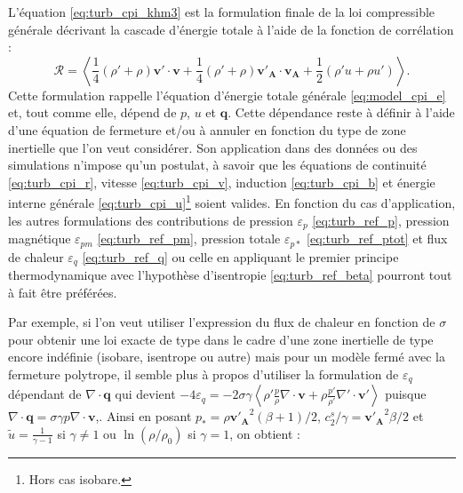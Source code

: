 L'équation \eqref{eq:turb_cpi_khm3} est la formulation finale de la loi  compressible générale décrivant la cascade d'énergie totale à l'aide de la fonction de corrélation :  
\begin{equation*}
    \mathcal{R} = \left<\frac{1}{4} \left(\rho'+\rho\right) \boldsymbol{v'} \cdot  \boldsymbol{v} + \frac{1}{4} \left(\rho'+\rho\right) \boldsymbol{v'_A} \cdot  \boldsymbol{v_A} +\frac{1}{2} \left(\rho' u + \rho u'\right)\right>.
\end{equation*}
Cette formulation rappelle l'équation d'énergie totale générale \eqref{eq:model_cpi_e} et, tout comme elle, dépend de $p$, $u$ et $\boldsymbol{q}$. Cette dépendance reste à définir à l'aide d'une équation de fermeture et/ou à annuler en fonction du type de zone inertielle que l'on veut considérer. Son application dans des données ou des simulations n'impose qu'un postulat, à savoir que les équations de continuité \eqref{eq:turb_cpi_r}, vitesse \eqref{eq:turb_cpi_v}, induction \eqref{eq:turb_cpi_b} et énergie interne générale \eqref{eq:turb_cpi_u}\footnote{Hors cas isobare.} soient valides. En fonction du cas d'application, les autres formulations des contributions de pression $\varepsilon_p$ \eqref{eq:turb_ref_p}, pression magnétique $\varepsilon_{pm}$ \eqref{eq:turb_ref_pm}, pression totale $\varepsilon_{p*}$ \eqref{eq:turb_ref_ptot} et flux de chaleur $\varepsilon_q$ \eqref{eq:turb_ref_q} ou celle en appliquant le premier principe thermodynamique avec l'hypothèse d'isentropie \eqref{eq:turb_ref_beta} pourront tout à fait être préférées.

Par exemple, si l'on veut utiliser l'expression du flux de chaleur en fonction de $\sigma$ pour obtenir une loi exacte de type  dans le cadre d'une zone inertielle de type encore indéfinie (isobare, isentrope ou autre) mais pour un modèle fermé avec la fermeture polytrope, il semble plus à propos d'utiliser la formulation de $\varepsilon_q$ dépendant de $\nabla \cdot \boldsymbol{q}$ qui devient
$- 4\varepsilon_q = - 2 \sigma \gamma\left< \rho'\frac{p}{\rho}\nabla \cdot \boldsymbol{v} + \rho\frac{p'}{\rho'}\nabla' \cdot \boldsymbol{v'} \right>$ puisque $\nabla \cdot \boldsymbol{q} = \sigma \gamma p \nabla \cdot \boldsymbol{v}$,.
Ainsi en posant $p_* = \rho\boldsymbol{v'_A}^2\left(\beta +1\right)/2$, $c^s_2/\gamma = \boldsymbol{v'_A}^2\beta/2$ et $\tilde{u} = \frac{1}{\gamma-1}$ si $\gamma \neq 1$ ou $\ln\left(\rho/\rho_0\right)$ si $\gamma =1$, on obtient : 

